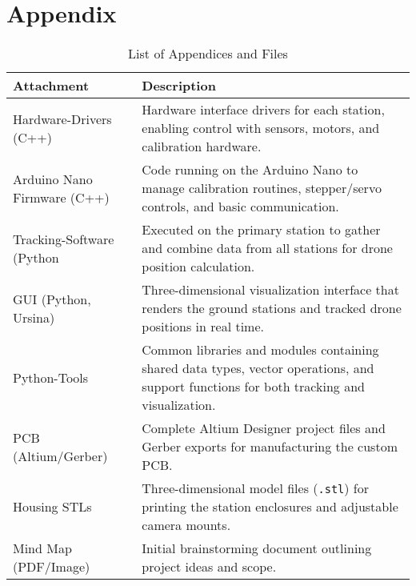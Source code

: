 \chapter*{Appendix}

\begin{table}[H]
	\centering
	\renewcommand{\arraystretch}{1.4} %
	\setlength{\tabcolsep}{8pt}      %
	\begin{tabular}{p{} p{}}
		\hline
		\textbf{Attachment} & \textbf{Description} \\
		\hline
		Hardware-Drivers (C++)
		& Hardware interface drivers for each station, enabling control with sensors, motors, and calibration hardware.\\
		
		Arduino Nano Firmware (C++)
		& Code running on the Arduino Nano to manage calibration routines, stepper/servo controls, and basic communication.\\
		
		Tracking-Software (Python
		& Executed on the primary station to gather and combine data from all stations for drone position calculation.\\
		
		GUI (Python, Ursina)
		& Three-dimensional visualization interface that renders the ground stations and tracked drone positions in real time.\\
		
		Python-Tools
		& Common libraries and modules containing shared data types, vector operations, and support functions for both tracking and visualization.\\
		
		PCB (Altium/Gerber)
		& Complete Altium Designer project files and Gerber exports for manufacturing the custom PCB.\\
		
		Housing STLs
		& Three-dimensional model files (\texttt{.stl}) for printing the station enclosures and adjustable camera mounts.\\
		
		Mind Map (PDF/Image)
		& Initial brainstorming document outlining project ideas and scope.\\
		\hline
	\end{tabular}
	\caption{List of Appendices and Files}
	\label{tab:appendixfiles}
\end{table}
